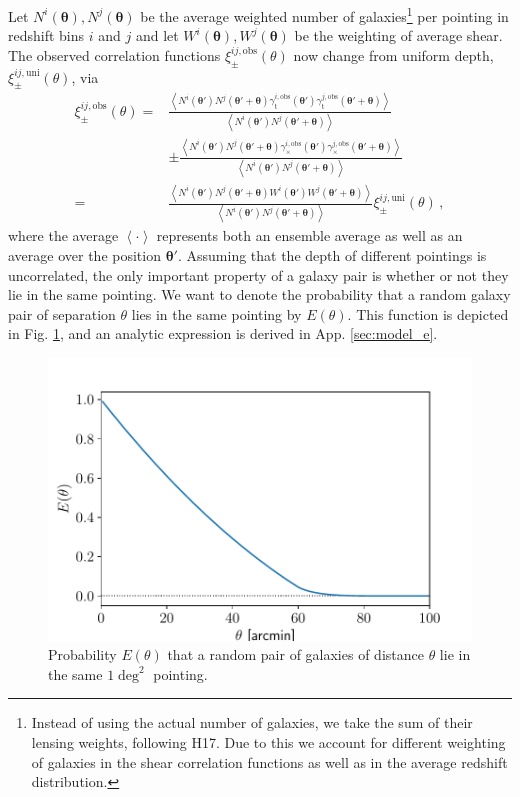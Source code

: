 \documentclass{aa}
\renewcommand{\rm}{\mathrm}
\def\b#1{\bm{#1}}
\def\la{\left<}
\def\ra{\right>}
\def\bthp{\b \theta' + \b \theta}
\def\bth{\b \theta'}
\begin{document}
Let $N^i(\b \theta),N^j(\b\theta)$ be the average weighted number of galaxies\footnote{Instead of using the actual number of galaxies, we take the sum of their lensing weights, following H17. Due to this we account for different weighting of galaxies in the shear correlation functions as well as in the average redshift distribution.} per pointing in redshift bins $i$ and $j$ and let $W^i(\b \theta),W^j(\b\theta)$ be the weighting of average shear. The observed correlation functions $\xi^{ij,\text{obs}}_\pm(\theta)$ now change from uniform depth, $\xi_\pm^{ij,\rm{uni}}(\theta)$, via %
\begin{align}
\xi^{ij,\text{obs}}_\pm(\theta) = & \frac{\la N^i(\bth)N^j(\bthp)\gamma^{i,\rm{obs}}_{\rm t}(\bth)\gamma^{j,\rm{obs}}_{\rm t}(\bthp)\ra }{\la N^i(\bth)N^j(\bthp)\ra} \\
 & \pm \frac{\la N^i(\bth)N^j(\bthp)\gamma^{i,\rm{obs}}_\times(\bth)\gamma^{j,\rm{obs}}_\times(\bthp)\ra }{\la N^i(\bth)N^j(\bthp)\ra} \nonumber\\
 = & \frac{\la N^i(\bth)N^j(\bthp)W^i(\bth)W^j(\bthp)\ra}{\la N^i(\bth)N^j(\bthp)\ra} \xi_{\pm}^{ij,\rm{uni}}(\theta) \, ,
 \label{eq:xipmblub1}
 \end{align}
 where the average $\la\cdot\ra$ represents both an ensemble average as well as an average over the position $\bth$.
 Assuming that the depth of different pointings is uncorrelated, the only important property of a galaxy pair is whether or not they lie in the same pointing. We want to denote the probability that a random galaxy pair of separation $\theta$ lies in the same pointing by $E(\theta)$. This function is depicted in Fig. \ref{fig:eoftheta_lin}, and an analytic expression is derived in App. \ref{sec:model_e}.
 
\begin{figure}
 \centering
 \includegraphics[width=0.9\linewidth]{images/eoftheta.pdf}
 \caption{Probability $E(\theta)$ that a random pair of galaxies of distance $\theta$ lie in the same $1\deg ^2$ pointing.}
 \label{fig:eoftheta_lin}
\end{figure}
\end{document}
